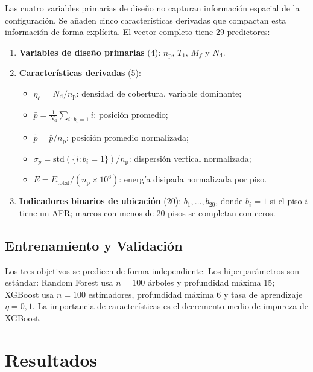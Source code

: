 \documentclass[preprint,12pt,authoryear]{elsarticle}
\newcommand{\nd}{N_{\mathrm{d}}}
\newcommand{\np}{n_{\mathrm{p}}}
\newcommand{\etad}{\eta_{\mathrm{d}}}
\newcommand{\Mf}{M_{\!f}}
\begin{document}
Las cuatro variables primarias de diseño no capturan información espacial de
la configuración. Se añaden cinco características derivadas que compactan
esta información de forma explícita. El vector completo tiene 29 predictores:

\begin{enumerate}[label=\textit{\roman*})]
    \item \textbf{Variables de diseño primarias} (4):
          $\np$, $T_1$, $\Mf$ y $\nd$.

    \item \textbf{Características derivadas} (5):
    \begin{itemize}
        \item $\etad = \nd/\np$: densidad de cobertura, variable dominante;
        \item $\bar{p} = \tfrac{1}{\nd}\sum_{i:\,b_i=1} i$: posición promedio;
        \item $\tilde{p} = \bar{p}/\np$: posición promedio normalizada;
        \item $\sigma_p = \mathrm{std}\!\left(\{i:b_i=1\}\right)/\np$:
              dispersión vertical normalizada;
        \item $\tilde{E} = E_{\mathrm{total}}/(\np\times10^6)$: energía
              disipada normalizada por piso.
    \end{itemize}

    \item \textbf{Indicadores binarios de ubicación} (20):
          $b_1,\ldots,b_{20}$, donde $b_i=1$ si el piso $i$ tiene un AFR;
          marcos con menos de 20 pisos se completan con ceros.
\end{enumerate}

\subsection{Entrenamiento y Validación}
\label{sec:method:entrenamiento}

Los tres objetivos se predicen de forma independiente. Los hiperparámetros
son estándar: Random Forest usa $n=100$ árboles y profundidad máxima 15;
XGBoost usa $n=100$ estimadores, profundidad máxima 6 y tasa de aprendizaje
$\eta=0{,}1$. La importancia de características es el decremento medio de
impureza de XGBoost.

\section{Resultados}
\label{sec:results}
\end{document}
